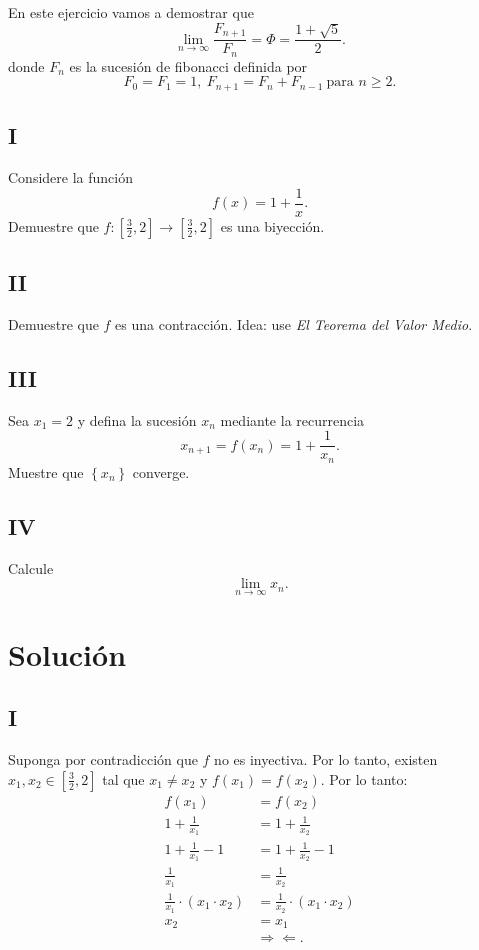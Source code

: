 \documentclass{report}
\begin{document}
En este ejercicio vamos a demostrar que \[
\displaystyle\lim_{n \to \infty}\frac{F_{n+1}}{F_n} = \Phi = \frac{1 + \sqrt{5} }{2}
.\] donde $F_n$ es la sucesión de fibonacci definida por \[
F_0 = F_1 = 1,\ F_{n + 1} = F_n + F_{n - 1}\ \text{para } n \ge 2
.\] 
\subsection{I} Considere la función \[
f\left( x \right) = 1 + \frac{1}{x}
.\] Demuestre que $f: \left[ \frac{3}{2}, 2 \right] \to \left[ \frac{3}{2}, 2 \right] $ es una biyección.

\subsection{II} Demuestre que $f$ es una contracción. Idea: use \textit{El Teorema del Valor Medio}.

\subsection{III} Sea $x_1 = 2$ y defina la sucesión $x_n$ mediante la recurrencia \[
x_{n + 1} = f\left( x_n \right)  = 1 + \frac{1}{x_n}
.\] Muestre que $\left\{ x_n \right\} $ converge.

\subsection{IV} Calcule \[
  \displaystyle\lim_{n \to \infty} x_n
.\] 

\section{Solución}
\subsection{I}


Suponga por contradicción que $f$ no es inyectiva. Por lo tanto, existen $x_1, x_2 \in \left[ \frac{3}{2}, 2 \right]$ tal que $x_1 \neq x_2$ y $f\left( x_1 \right) = f\left( x_2 \right) $. Por lo tanto:
\begin{align*}
  f\left( x_1 \right) &= f\left( x_2 \right) \\
  1 + \frac{1}{x_1} &= 1 + \frac{1}{x_2} \\
  1 + \frac{1}{x_1} - 1 &=  1 + \frac{1}{x_2} - 1 \\
  \frac{1}{x_{1}} &= \frac{1}{x_2} \\
  \frac{1}{x_1}\cdot \left( x_1\cdot x_2 \right) &= \frac{1}{x_2}\cdot \left( x_1\cdot x_2 \right)  \\
  x_2 &= x_1 \\
      &\Rightarrow\!\Leftarrow
.\end{align*}
\end{document}
